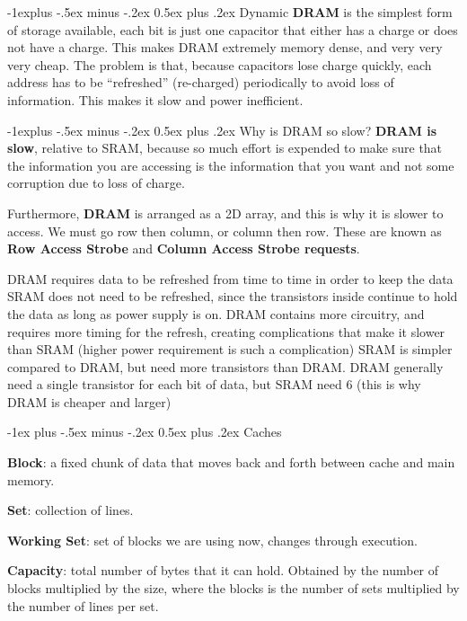 \documentclass[10pt,landscape]{article}
\makeatletter
\renewcommand{\section}{\@startsection{section}{1}{0mm}%
                                {-1ex plus -.5ex minus -.2ex}%
                                {0.5ex plus .2ex}%
                                {\normalfont\large\bfseries}}
\renewcommand{\subsection}{\@startsection{subsection}{2}{0mm}%
                                {-1explus -.5ex minus -.2ex}%
                                {0.5ex plus .2ex}%
                                {\normalfont\normalsize\bfseries}}
\makeatother
\begin{document}
\begin{multicols}{3}
\subsection{Dynamic}
{\bf DRAM} is the simplest form of storage available, each bit is just one capacitor that either has a charge or does not have a charge. This makes DRAM extremely memory dense, and very very very cheap. The problem is that, because capacitors lose charge quickly, each address has to be ``refreshed'' (re-charged) periodically to avoid loss of information. This makes it slow and power inefficient.

\subsection{Why is DRAM so slow?}
{\bf DRAM is slow}, relative to SRAM, because so much effort is expended to make sure that the information you are accessing is the information that you want and not some corruption due to loss of charge.

Furthermore, {\bf DRAM} is arranged as a 2D array, and this is why it is slower to access. We must go
row then column, or column then row. These are known as {\bf Row Access
Strobe} and {\bf Column Access Strobe requests}.

DRAM requires data to be refreshed from time to time in order to keep the data
SRAM does not need to be refreshed, since the transistors inside continue to hold the data as long as power supply is on. DRAM contains more circuitry, and requires more timing for the refresh, creating complications that make it slower than SRAM (higher power requirement is such a complication)
SRAM is simpler compared to DRAM, but need more transistors than DRAM. DRAM generally need a single transistor for each bit of data, but SRAM need 6 (this is why DRAM is cheaper and larger)

\section{Caches}

{\bf Block}: a fixed chunk of data that moves back and forth between cache and main memory. 

{\bf Set}: collection of lines. 

{\bf Working Set}: set of blocks we are using now, changes through execution. 

{\bf Capacity}:  total number of bytes that it can hold. Obtained by the number of blocks multiplied by the size, where the blocks is the number of sets multiplied by the number of lines per set. 


\end{multicols}
\end{document}
